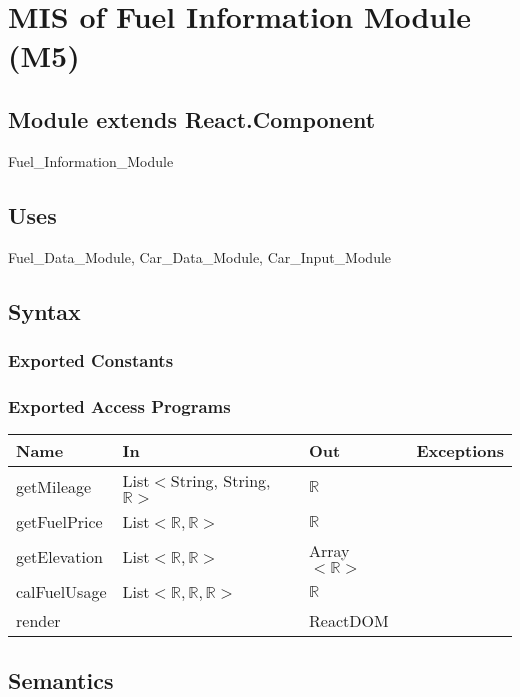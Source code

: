 \documentclass[12pt, titlepage]{article}
\begin{document}
\section{MIS of Fuel Information Module (M5)} 

\label{Module} 

\subsection{Module extends React.Component}

Fuel\_Information\_Module

\subsection{Uses}

Fuel\_Data\_Module, Car\_Data\_Module, Car\_Input\_Module

\subsection{Syntax}

\subsubsection{Exported Constants}

\subsubsection{Exported Access Programs}

\begin{tabular}{| l | l | l | l |}
  \hline
  \textbf{Name} & \textbf{In} & \textbf{Out} & \textbf{Exceptions}\\
  \hline
  getMileage & List$<$String, String, $\mathbb{R}>$ & $\mathbb{R}$ & ~\\
  \hline
  getFuelPrice & List$<\mathbb{R},\mathbb{R}>$ & $\mathbb{R}$ & ~\\
  \hline
  getElevation & List$<\mathbb{R},\mathbb{R}>$ & Array$<\mathbb{R}>$ & ~\\
  \hline
  calFuelUsage & List$<\mathbb{R},\mathbb{R},\mathbb{R}>$ & $\mathbb{R}$ & ~\\
  \hline
  render & ~ & ReactDOM & ~\\
  \hline
\end{tabular}


\subsection{Semantics}
\end{document}
